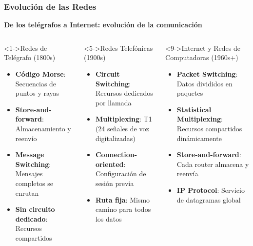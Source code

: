 \documentclass[aspectratio=169]{beamer}
\begin{document}
\begin{frame}
\frametitle{Evolución de las Redes}

\begin{center}
\Large \textbf{De los telégrafos a Internet: evolución de la comunicación}
\end{center}

\begin{columns}
\begin{block}<1->{Redes de Telégrafo (1800s)}
\begin{itemize}
\item<1-> \textbf{Código Morse}: Secuencias de puntos y rayas
\item<2-> \textbf{Store-and-forward}: Almacenamiento y reenvío
\item<3-> \textbf{Message Switching}: Mensajes completos se enrutan
\item<4-> \textbf{Sin circuito dedicado}: Recursos compartidos
\end{itemize}
\end{block}

\begin{block}<5->{Redes Telefónicas (1900s)}
\begin{itemize}
\item<5-> \textbf{Circuit Switching}: Recursos dedicados por llamada
\item<6-> \textbf{Multiplexing}: T1 (24 señales de voz digitalizadas)
\item<7-> \textbf{Connection-oriented}: Configuración de sesión previa
\item<8-> \textbf{Ruta fija}: Mismo camino para todos los datos
\end{itemize}
\end{block}

\begin{block}<9->{Internet y Redes de Computadoras (1960s+)}
\begin{itemize}
\item<9-> \textbf{Packet Switching}: Datos divididos en paquetes
\item<10-> \textbf{Statistical Multiplexing}: Recursos compartidos dinámicamente
\item<11-> \textbf{Store-and-forward}: Cada router almacena y reenvía
\item<12-> \textbf{IP Protocol}: Servicio de datagramas global
\end{itemize}
\end{block}


\end{columns}
\end{frame}
\end{document}
